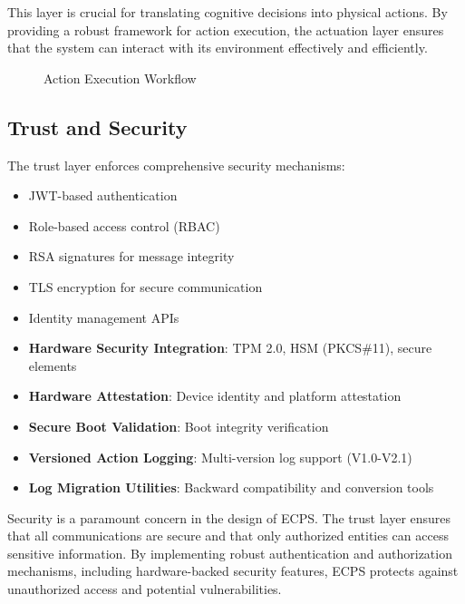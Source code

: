 \documentclass[12pt]{article}
\begin{document}
This layer is crucial for translating cognitive decisions into physical actions. By providing a robust framework for action execution, the actuation layer ensures that the system can interact with its environment effectively and efficiently.

\begin{figure}[H]
\centering
{}
\caption{Action Execution Workflow}
\end{figure}

\subsection{Trust and Security}
The trust layer enforces comprehensive security mechanisms:
\begin{itemize}
  \item JWT-based authentication
  \item Role-based access control (RBAC)
  \item RSA signatures for message integrity
  \item TLS encryption for secure communication
  \item Identity management APIs
  \item \textbf{Hardware Security Integration}: TPM 2.0, HSM (PKCS\#11), secure elements
  \item \textbf{Hardware Attestation}: Device identity and platform attestation
  \item \textbf{Secure Boot Validation}: Boot integrity verification
  \item \textbf{Versioned Action Logging}: Multi-version log support (V1.0-V2.1)
  \item \textbf{Log Migration Utilities}: Backward compatibility and conversion tools
\end{itemize}

Security is a paramount concern in the design of ECPS. The trust layer ensures that all communications are secure and that only authorized entities can access sensitive information. By implementing robust authentication and authorization mechanisms, including hardware-backed security features, ECPS protects against unauthorized access and potential vulnerabilities.
\end{document}
